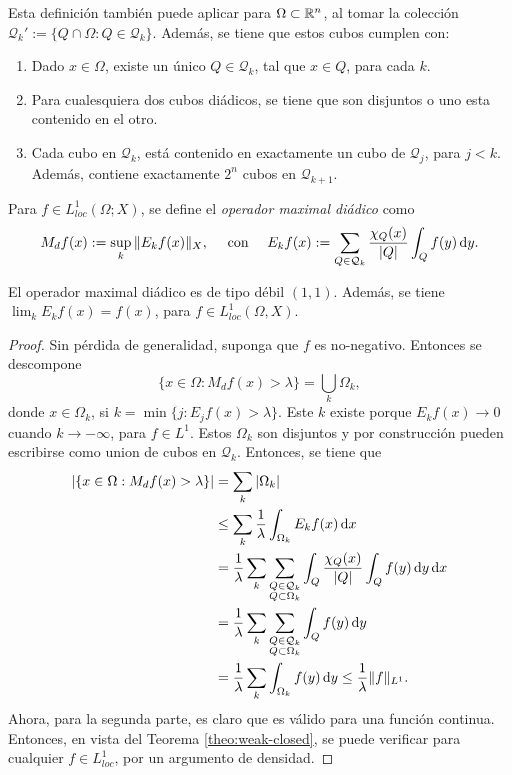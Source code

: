 \begin{remark}
	Esta definición también puede aplicar para $\Omega\subset\mathbb{R}^n$, al tomar la colección $\mathcal{Q}_k' := \{Q\cap\Omega: Q\in\mathcal{Q}_k\}$. Además, se tiene que estos cubos cumplen con:
	\begin{enumerate}
		\item Dado $x\in\Omega$, existe un único $Q\in\mathcal{Q}_k$, tal que $x\in Q$, para cada $k$. 
		\item Para cualesquiera dos cubos diádicos, se tiene que son disjuntos o uno esta contenido en el otro. 
		\item Cada cubo en $\mathcal{Q}_k$, está contenido en exactamente un cubo de $\mathcal{Q}_j$, para $j<k$. Además, contiene exactamente $2^n$ cubos en $\mathcal{Q}_{k+1}$.
	\end{enumerate}
\end{remark}
\begin{definition}
	Para $f\in L^1_{loc}(\Omega;X)$, se define el \textit{operador maximal diádico} como 
	\begin{equation*}
		M_df(x) := \sup_k \|E_kf(x)\|_X, \quad \text{ con } \quad E_kf(x) := \sum_{Q\in\mathcal{Q}_k} \frac{\chi_Q(x)}{|Q|} \int_Q f(y) \mathop{}\!\mathrm{d} y.
	\end{equation*}
\end{definition}
\begin{theorem}
	El operador maximal diádico es de tipo débil $(1, 1)$. Además, se tiene $\lim_k E_k f(x) = f(x) $, para $f\in L^1_{loc}(\Omega, X)$.
\end{theorem}
\begin{proof}
	Sin pérdida de generalidad, suponga que $f$ es no-negativo. Entonces se descompone 
	\begin{equation*}
		\{x\in\Omega: M_df(x)>\lambda\} = \bigcup_k \Omega_k,
	\end{equation*}
	donde $x\in\Omega_k$, si $k = \min\{j: E_jf(x) > \lambda\}$. Este $k$ existe porque $E_kf(x)\to0$ cuando $k\to-\infty$, para $f\in L^1$. Estos $\Omega_k$ son disjuntos y por construcción pueden escribirse como union de cubos en $\mathcal{Q}_k$. Entonces, se tiene que 
	\begin{align*}
		| \{x\in\Omega: M_df(x)>\lambda\}  | & = \sum_k |\Omega_k| \\
		& \leq \sum_k \frac{1}{\lambda} \int_{\Omega_k} E_k f(x)\mathop{}\!\mathrm{d} x \\
		& = \frac{1}{\lambda} \sum_k \sum_{\substack{Q\in\mathcal{Q}_k\\ Q\subset\Omega_k}} \int_Q \frac{\chi_Q(x)}{|Q|}\int_Q f(y) \mathop{}\!\mathrm{d} y \mathop{}\!\mathrm{d} x \\
		& = \frac{1}{\lambda} \sum_k \sum_{\substack{Q\in\mathcal{Q}_k\\ Q\subset\Omega_k}} \int_Q f(y) \mathop{}\!\mathrm{d} y\\
		& = \frac{1}{\lambda} \sum_k \int_{\Omega_k} f(y)\mathop{}\!\mathrm{d} y
		\leq \frac{1}{\lambda} \|f\|_{L^1}.
	\end{align*}
	Ahora, para la segunda parte, es claro que es válido para una función continua. Entonces, en vista del Teorema \ref{theo:weak-closed}, se puede verificar para cualquier $f\in L^1_{loc}$, por un argumento de densidad.
\end{proof}
